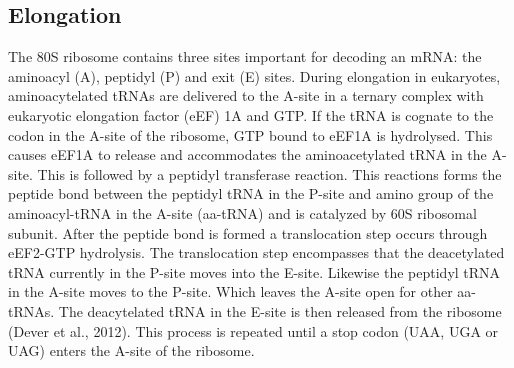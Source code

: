 \documentclass[12pt,openany]{book}
\begin{document}
\subsection{Elongation} \label{elongation}

The 80S ribosome contains three sites important for decoding an mRNA:
the aminoacyl (A), peptidyl (P) and exit (E) sites. During elongation in
eukaryotes, aminoacytelated tRNAs are delivered to the A-site in a
ternary complex with eukaryotic elongation factor (eEF) 1A and GTP. If
the tRNA is cognate to the codon in the A-site of the ribosome, GTP
bound to eEF1A is hydrolysed. This causes eEF1A to release and
accommodates the aminoacetylated tRNA in the A-site. This is followed by
a peptidyl transferase reaction. This reactions forms the peptide bond
between the peptidyl tRNA in the P-site and amino group of the
aminoacyl-tRNA in the A-site (aa-tRNA) and is catalyzed by 60S ribosomal
subunit. After the peptide bond is formed a translocation step occurs
through eEF2-GTP hydrolysis. The translocation step encompasses that the
deacetylated tRNA currently in the P-site moves into the E-site.
Likewise the peptidyl tRNA in the A-site moves to the P-site. Which
leaves the A-site open for other aa-tRNAs. The deacytelated tRNA in the
E-site is then released from the ribosome (Dever et al., 2012). This
process is repeated until a stop codon (UAA, UGA or UAG) enters the
A-site of the ribosome.
\end{document}
